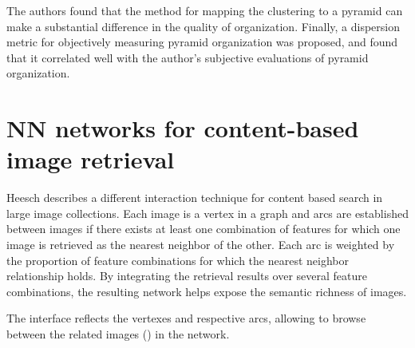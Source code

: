 The authors found that the method for mapping the clustering to a pyramid can make a substantial difference in the quality of organization. Finally, a dispersion metric for objectively measuring pyramid organization was proposed, and found that it correlated well with the author's subjective evaluations of pyramid organization.



\section{NN networks for content-based image retrieval} %
\label{sub:Heesch}

Heesch \cite{Heesch:2004p2675} describes a different interaction technique for content based search in large image collections. Each image is a vertex in a graph and arcs are established between images if there exists at least one combination of features for which one image is retrieved as the nearest neighbor of the other. Each arc is weighted by the proportion of feature combinations for which the nearest neighbor relationship holds. By integrating the retrieval results over several feature combinations, the resulting network helps expose the semantic richness of images.

The interface reflects the vertexes and respective arcs, allowing to browse between the related images () in the network.

